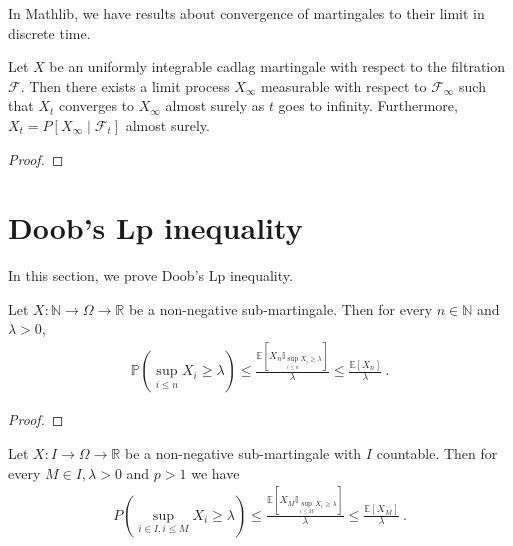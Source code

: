 In Mathlib, we have results about convergence of martingales to their limit in discrete time.


\begin{theorem}\label{thm:tendsto_limitProcess_of_cadlag}
Let $X$ be an uniformly integrable cadlag martingale with respect to the filtration $\mathcal{F}$.
Then there exists a limit process $X_\infty$ measurable with respect to $\mathcal{F}_\infty$ such that $X_t$ converges to $X_\infty$ almost surely as $t$ goes to infinity.
Furthermore, $X_t = P[X_\infty \mid \mathcal{F}_t]$ almost surely.
\end{theorem}

\begin{proof}

\end{proof}





\section{Doob's Lp inequality}

In this section, we prove Doob's Lp inequality.


\begin{lemma}\label{lem:maximal_ineq}
  \mathlibok
Let $X : \mathbb{N} \rightarrow \Omega \rightarrow \mathbb{R}$ be a non-negative sub-martingale.
Then for every $n \in \mathbb{N}$ and $\lambda > 0$,
\begin{align*}
  \mathbb{P}\left(\sup_{i \le n}X_i\geq\lambda \right)
  \le \frac{\mathbb{E}\left[X_n \mathbb{I}_{\sup_{i \le n}X_i \ge \lambda}\right]}{\lambda}
  \le \frac{\mathbb{E}[X_n]}{\lambda}
  \: .
\end{align*}
\end{lemma}

\begin{proof}\leanok

\end{proof}


\begin{lemma}\label{lem:doob_countable}
  \leanok
  Let $X : I \rightarrow \Omega \rightarrow \mathbb{R}$ be a non-negative sub-martingale with $I$ countable.
  Then for every $M \in I,\lambda > 0$ and $p>1$ we have
  \begin{align*}
    P\left( \sup_{i\in I, i\leq M}X_i\geq\lambda \right)
    \le \frac{\mathbb{E}\left[X_M \mathbb{I}_{\sup_{i \le M}X_i \ge \lambda}\right]}{\lambda}
    \le \frac{\mathbb{E}[X_M]}{\lambda}
    \: .
  \end{align*}
\end{lemma}

